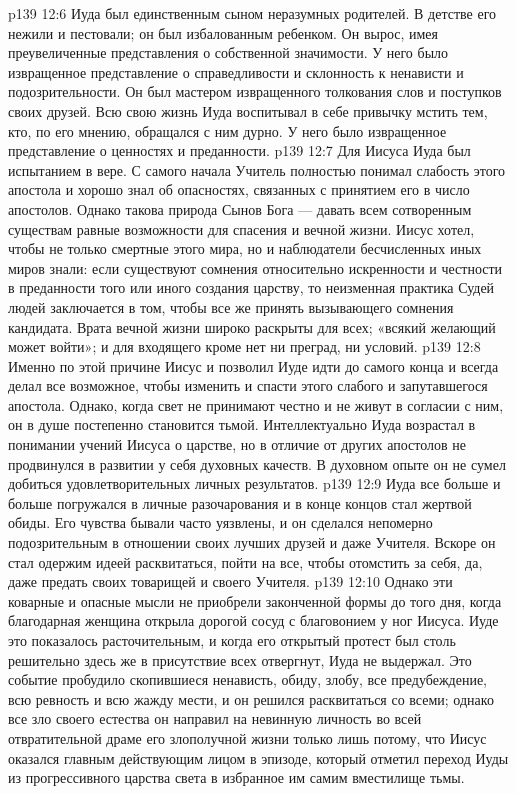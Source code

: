 \vs p139 12:6 Иуда был единственным сыном неразумных родителей. В детстве его нежили и пестовали; он был избалованным ребенком. Он вырос, имея преувеличенные представления о собственной значимости. У него было извращенное представление о справедливости и склонность к ненависти и подозрительности. Он был мастером извращенного толкования слов и поступков своих друзей. Всю свою жизнь Иуда воспитывал в себе привычку мстить тем, кто, по его мнению, обращался с ним дурно. У него было извращенное представление о ценностях и преданности.
\vs p139 12:7 \pc Для Иисуса Иуда был испытанием в вере. С самого начала Учитель полностью понимал слабость этого апостола и хорошо знал об опасностях, связанных с принятием его в число апостолов. Однако такова природа Сынов Бога --- давать всем сотворенным существам равные возможности для спасения и вечной жизни. Иисус хотел, чтобы не только смертные этого мира, но и наблюдатели бесчисленных иных миров знали: если существуют сомнения относительно искренности и честности в преданности того или иного создания царству, то неизменная практика Судей людей заключается в том, чтобы все же принять вызывающего сомнения кандидата. Врата вечной жизни широко раскрыты для всех; «всякий желающий может войти»; и для входящего кроме  нет ни преград, ни условий.
\vs p139 12:8 Именно по этой причине Иисус и позволил Иуде идти до самого конца и всегда делал все возможное, чтобы изменить и спасти этого слабого и запутавшегося апостола. Однако, когда свет не принимают честно и не живут в согласии с ним, он в душе постепенно становится тьмой. Интеллектуально Иуда возрастал в понимании учений Иисуса о царстве, но в отличие от других апостолов не продвинулся в развитии у себя духовных качеств. В духовном опыте он не сумел добиться удовлетворительных личных результатов.
\vs p139 12:9 \pc Иуда все больше и больше погружался в личные разочарования и в конце концов стал жертвой обиды. Его чувства бывали часто уязвлены, и он сделался непомерно подозрительным в отношении своих лучших друзей и даже Учителя. Вскоре он стал одержим идеей расквитаться, пойти на все, чтобы отомстить за себя, да, даже предать своих товарищей и своего Учителя.
\vs p139 12:10 Однако эти коварные и опасные мысли не приобрели законченной формы до того дня, когда благодарная женщина открыла дорогой сосуд с благовонием у ног Иисуса. Иуде это показалось расточительным, и когда его открытый протест был столь решительно здесь же в присутствие всех отвергнут, Иуда не выдержал. Это событие пробудило скопившиеся ненависть, обиду, злобу, все предубеждение, всю ревность и всю жажду мести, и он решился расквитаться со всеми; однако все зло своего естества он направил на невинную личность во всей отвратительной драме его злополучной жизни только лишь потому, что Иисус оказался главным действующим лицом в эпизоде, который отметил переход Иуды из прогрессивного царства света в избранное им самим вместилище тьмы.
